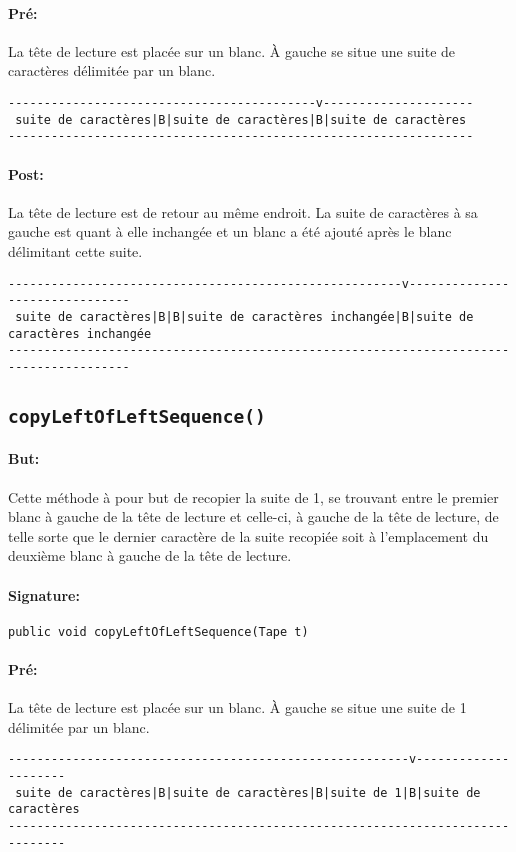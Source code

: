 \documentclass[a4paper,11pt]{article}
\begin{document}
\paragraph{Pré:} La tête de lecture est placée sur un blanc. À gauche se situe une suite de caractères délimitée par un blanc.
\begin{verbatim}
-------------------------------------------v---------------------
 suite de caractères|B|suite de caractères|B|suite de caractères
-----------------------------------------------------------------
\end{verbatim}
\paragraph{Post:} La tête de lecture est de retour au même endroit. La suite de caractères à sa gauche est quant à elle inchangée et un blanc a été ajouté après le blanc délimitant cette suite.
\begin{small}
\begin{verbatim}
-------------------------------------------------------v-------------------------------
 suite de caractères|B|B|suite de caractères inchangée|B|suite de caractères inchangée
---------------------------------------------------------------------------------------
\end{verbatim}
\end{small}
\subsection{\texttt{copyLeftOfLeftSequence()}}
\paragraph{But:} Cette méthode à pour but de recopier la suite de 1, se trouvant entre le premier blanc à gauche de la tête de lecture et celle-ci, à gauche de la tête de lecture, de telle sorte que le dernier caractère de la suite recopiée soit à l'emplacement du deuxième blanc à gauche de la tête de lecture.
\paragraph{Signature:} \texttt{public void copyLeftOfLeftSequence(Tape t)}
\paragraph{Pré:} La tête de lecture est placée sur un blanc. À gauche se situe une suite de 1 délimitée par un blanc.
\begin{verbatim}
--------------------------------------------------------v---------------------
 suite de caractères|B|suite de caractères|B|suite de 1|B|suite de caractères
------------------------------------------------------------------------------
\end{verbatim}
\end{document}
